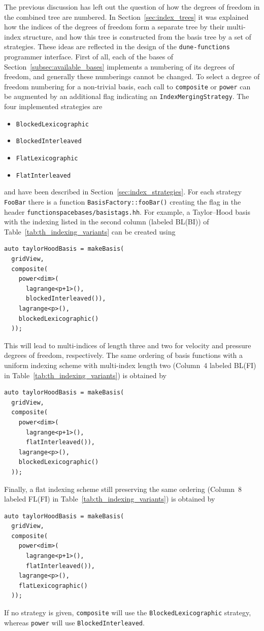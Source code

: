 \documentclass[a4paper,10pt,headings=normal,bibliography=totoc]{scrartcl}
\newcommand{\cpp}[1]{\lstinline[basicstyle=\ttfamily]!#1!}
\newcommand{\dunemodule}[1]{\texttt{#1}}
\newcommand{\file}[1]{\texttt{#1}}
\begin{document}
The previous discussion has left out the question of how the degrees of freedom in the combined tree
are numbered.  In Section~\ref{sec:index_trees} it was explained how the indices
of the degrees of freedom form a separate tree by their multi-index structure, and how this tree
is constructed from the basis tree by a set of strategies.
These ideas are reflected in the design of the \dunemodule{dune-functions} programmer interface.
First of all, each of the bases of
Section~\ref{subsec:available_bases} implements a numbering of its degrees of freedom,
and generally these numberings cannot be changed.
To select a degree of freedom numbering for a non-trivial basis,
each call to \cpp{composite} or \cpp{power} can be augmented by an additional
flag indicating an \cpp{IndexMergingStrategy}. The four implemented strategies are
\begin{itemize}
  \item
    \cpp{BlockedLexicographic}
  \item
    \cpp{BlockedInterleaved}
  \item
    \cpp{FlatLexicographic}
  \item
    \cpp{FlatInterleaved}
\end{itemize}
and have been described in Section~\ref{sec:index_strategies}.
For each strategy \cpp{FooBar} there is a function \cpp{BasisFactory::fooBar()} creating
the flag in the header \file{functionspacebases/basistags.hh}.
For example, a Taylor--Hood basis with the indexing listed in the
second column (labeled BL(BI)) of Table~\ref{tab:th_indexing_variants} can be created using
\begin{lstlisting}[style=Example]
auto taylorHoodBasis = makeBasis(
  gridView,
  composite(
    power<dim>(
      lagrange<p+1>(),
      blockedInterleaved()),
    lagrange<p>(),
    blockedLexicographic()
  ));
\end{lstlisting}
This will lead to multi-indices of length three and two
for velocity and pressure degrees of freedom, respectively.
The same ordering of basis functions with a uniform indexing scheme
with multi-index length two (Column~4 labeled BL(FI) in Table~\ref{tab:th_indexing_variants}) is obtained by
\begin{lstlisting}[style=Example]
auto taylorHoodBasis = makeBasis(
  gridView,
  composite(
    power<dim>(
      lagrange<p+1>(),
      flatInterleaved()),
    lagrange<p>(),
    blockedLexicographic()
  ));
\end{lstlisting}
Finally, a flat indexing scheme still preserving the same ordering
(Column~8 labeled FL(FI) in Table~\ref{tab:th_indexing_variants})
is obtained by
\begin{lstlisting}[style=Example]
auto taylorHoodBasis = makeBasis(
  gridView,
  composite(
    power<dim>(
      lagrange<p+1>(),
      flatInterleaved()),
    lagrange<p>(),
    flatLexicographic()
  ));
\end{lstlisting}
If no strategy is given, \cpp{composite} will use the \cpp{BlockedLexicographic} strategy,
whereas \cpp{power} will use \cpp{BlockedInterleaved}.
\end{document}
